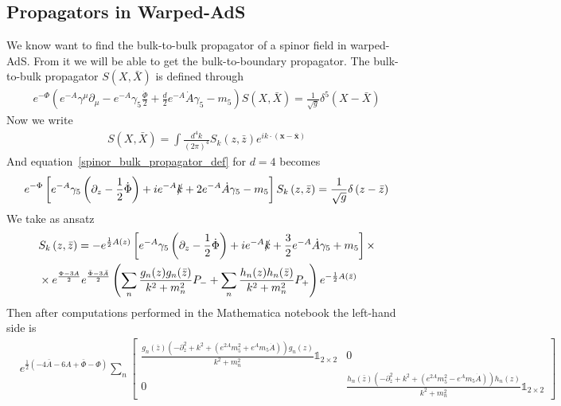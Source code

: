 \documentclass[12pt,a4paper]{article}
\begin{document}
\subsection{Propagators in Warped-AdS}
We know want to find the bulk-to-bulk propagator of a spinor field in warped-AdS. From it we will be able to get the bulk-to-boundary propagator. The bulk-to-bulk propagator $S\left(X,\bar{X}\right)$ is defined through
\begin{align}
    e^{-\Phi}\left( e^{-A} \gamma^{\mu} \partial_\mu -e^{-A} \gamma_5 \frac{\dot{\Phi}}{2}+ \frac{d}{2} e^{-A} \dot{A} \gamma_5 - m_5 \right) S \left(X, \bar{X}\right) = \frac{1}{\sqrt{g}} \delta^5 \left( X - \bar{X} \right)
\label{spinor_bulk_propagator_def}
\end{align}
Now we write
\begin{align}
    S\left(X,\bar{X}\right) = \int \frac{d^4 k}{{\left(2\pi\right)}^4} S_k \left(z,\bar{z}\right) e^{i k \cdot \left(\mathbf{x}-\mathbf{\bar{x}}\right)}
\end{align}
And equation~\ref{spinor_bulk_propagator_def} for $d=4$ becomes
\begin{align}
    e^{-\Phi}\left[ e^{-A} \gamma_5 \left( \partial_z - \frac{1}{2} \dot{\Phi} \right) + i e^{-A} \slashed{k} + 2 e^{-A} \dot{A} \gamma_5 - m_5 \right] S_k \left(z, \bar{z}\right) = \frac{1}{\sqrt{g}} \delta \left( z - \bar{z} \right)
\label{spinor_bulk_propagator_def_fourier}
\end{align}
We take as ansatz
\begin{align}
    & S_k \left(z, \bar{z}\right) = - e^{\frac{1}{2}A\left(z\right)} \left[ e^{-A} \gamma_5 \left( \partial_z - \frac{1}{2} \dot{\Phi} \right) + i e^{-A} \slashed{k} + \frac{3}{2} e^{-A} \dot{A} \gamma_5 + m_5 \right] \times \\
    & \times e^{\frac{\Phi-3 A}{2}}e^{\frac{\bar{\Phi}-3 \bar{A}}{2}} \left( \sum_n \frac{g_n(z)g_n(\bar{z})}{k^2+ m_n^2} P_{-} + \sum_n \frac{h_n(z)h_n(\bar{z})}{k^2+ m_n^2} P_{+} \right)e^{-\frac{1}{2}A\left(\bar{z}\right)} \notag
\label{spinor_bulk_propagator_sol_fourier}
\end{align}
Then after computations performed in the Mathematica notebook the left-hand side is
\begin{align}
    &e^{\frac{1}{2} \left( - 4 \bar{A} - 6 A + \bar{\Phi}-\Phi \right)} \sum_n
    \begin{bmatrix}
        \frac{g_n\left(\bar{z}\right)\left( - \partial_z^2 + k^2 + \left( e^{2 A} m_5^2 + e^{A} m_5 \dot{A} \right)  \right)g_n\left(z\right)}{k^2+m_n^2}\mathds{1}_{2\times 2} & 0 \\
        0 & \frac{h_n\left(\bar{z}\right)\left( - \partial_z^2 + k^2 + \left( e^{2 A} m_5^2 - e^{A} m_5 \dot{A} \right)  \right)h_n\left(z\right)}{k^2+m_n^2}\mathds{1}_{2\times 2}
    \end{bmatrix}
\end{align}
\end{document}
